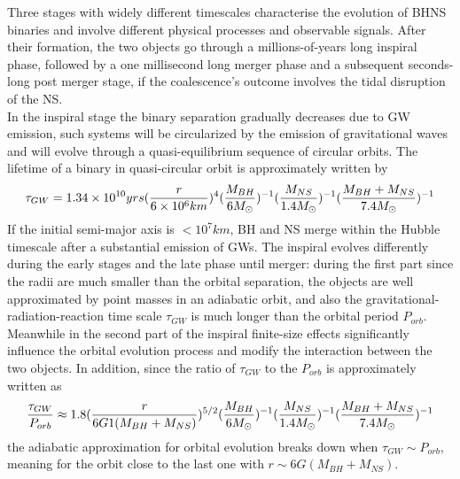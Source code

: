 \documentclass[binding=0.6cm, LaM]{sapthesis}
\begin{document}
        Three stages with widely different timescales characterise the evolution of BHNS binaries
        and involve different physical processes and observable signals.
        After their formation, the two objects go through a millions-of-years long inspiral phase,
        followed by a one millisecond long merger phase and a subsequent seconds-long post merger stage,
        if the coalescence’s outcome involves the tidal disruption of the NS. \\
        In the inspiral stage the binary separation gradually decreases due to GW emission,
        such systems will be circularized by the emission of gravitational waves
        and will evolve through a quasi-equilibrium sequence of circular orbits.
        The lifetime of a binary in quasi-circular orbit is approximately written by
                \begin{equation}
                        \tau_{GW} = 1.34 \times 10^{10} yrs ({{r} \over {6 \times 10^6 km}})^4 ({{M_{BH}} \over {6M_{\odot}}})^{-1} ({M_{NS} \over {1.4 M_{\odot}}})^{-1} ({{M_{BH} + M_{NS}} \over {7.4M_{\odot}}})^{-1}
                \end{equation}
        If the initial semi-major axis is $<10^7 km$, BH and NS merge within the Hubble
        timescale after a substantial emission of GWs.
        The inspiral evolves differently during the early stages and the late phase until merger:
        during the first part since the radii are much smaller than the orbital separation,
        the objects are well approximated by point masses in an adiabatic orbit,
        and also the gravitational-radiation-reaction time scale $\tau_{GW}$ is much longer than the orbital period $P_{orb}$.
        Meanwhile in the second part of the inspiral finite-size effects significantly influence the orbital evolution process
        and modify the interaction between the two objects.
        In addition, since the ratio of $\tau_{GW}$ to the $P_{orb}$ is approximately written as
                \begin{equation}
                        {{\tau_{GW}} \over {P_{orb}}} \approx 1.8 ({{r} \over {6 G 1(M_{BH}+M_{NS})}})^{5/2} ({{M_{BH}} \over {6M_{\odot}}})^{-1} ({M_{NS} \over {1.4 M_{\odot}}})^{-1} ({{M_{BH} + M_{NS}} \over {7.4M_{\odot}}})^{-1}
                \end{equation}
        the adiabatic approximation for orbital evolution breaks down when $\tau_{GW} \sim P_{orb}$,
        meaning for the orbit close to the last one with $r \sim 6G(M_{BH}+M_{NS})$.
\end{document}
